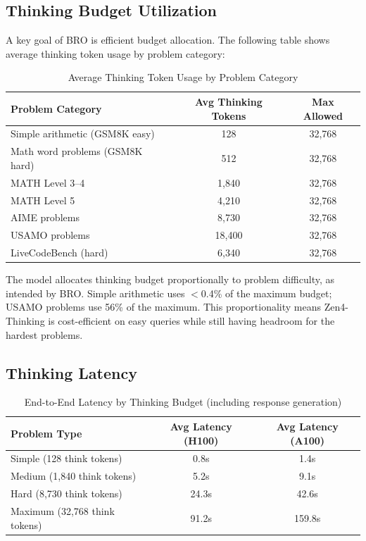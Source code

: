 \documentclass[11pt,a4paper]{article}
\begin{document}
\subsection{Thinking Budget Utilization}

A key goal of BRO is efficient budget allocation. The following table shows average
thinking token usage by problem category:

\begin{table}[H]
\centering
\begin{tabular}{lcc}
\toprule
\textbf{Problem Category} & \textbf{Avg Thinking Tokens} & \textbf{Max Allowed} \\
\midrule
Simple arithmetic (GSM8K easy) & 128    & 32,768 \\
Math word problems (GSM8K hard) & 512   & 32,768 \\
MATH Level 3--4                & 1,840  & 32,768 \\
MATH Level 5                   & 4,210  & 32,768 \\
AIME problems                  & 8,730  & 32,768 \\
USAMO problems                 & 18,400 & 32,768 \\
LiveCodeBench (hard)           & 6,340  & 32,768 \\
\bottomrule
\end{tabular}
\caption{Average Thinking Token Usage by Problem Category}
\end{table}

The model allocates thinking budget proportionally to problem difficulty, as intended
by BRO. Simple arithmetic uses $<$0.4\% of the maximum budget; USAMO problems use
56\% of the maximum. This proportionality means Zen4-Thinking is cost-efficient on
easy queries while still having headroom for the hardest problems.

\subsection{Thinking Latency}

\begin{table}[H]
\centering
\begin{tabular}{lcc}
\toprule
\textbf{Problem Type} & \textbf{Avg Latency (H100)} & \textbf{Avg Latency (A100)} \\
\midrule
Simple (128 think tokens)    & 0.8s   & 1.4s \\
Medium (1,840 think tokens)  & 5.2s   & 9.1s \\
Hard (8,730 think tokens)    & 24.3s  & 42.6s \\
Maximum (32,768 think tokens)& 91.2s  & 159.8s \\
\bottomrule
\end{tabular}
\caption{End-to-End Latency by Thinking Budget (including response generation)}
\end{table}
\end{document}
